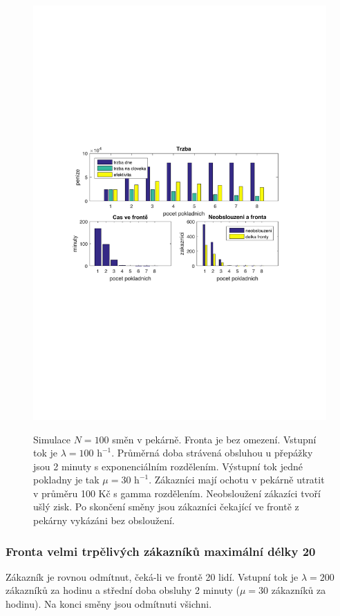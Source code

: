 \documentclass[a4paper,12pt]{article}
\begin{document}
\begin{figure}[h]
\centering
\includegraphics[width=0.99\columnwidth]{bezOmezeni.pdf}
\label{fig:bezOmezeni}
\caption{Simulace \(N=100\) směn v pekárně. Fronta je bez omezení.
Vstupní tok je \(\lambda = 100 \mbox{~h}^{-1}\). 
Průměrná doba strávená obsluhou u přepážky jsou 2 minuty s exponenciálním rozdělením. Výstupní tok 
jedné pokladny je tak \(\mu = 30 \mbox{~h}^{-1}\). Zákazníci mají ochotu v pekárně utratit v průměru 100 Kč s gamma rozdělením. 
Neobsloužení zákazíci tvoří ušlý zisk. Po skončení směny jsou zákazníci čekající ve frontě z pekárny vykázáni bez obsloužení.}
\end{figure}

\subsubsection{Fronta velmi trpělivých zákazníků maximální délky 20}
Zákazník je rovnou odmítnut, čeká-li ve frontě 20 lidí. Vstupní tok je \(\lambda = 200\) zákazníků za hodinu a
střední doba obsluhy 2 minuty (\(\mu = 30\) zákazníků za hodinu). Na konci směny jsou odmítnuti všichni. 
\end{document}
